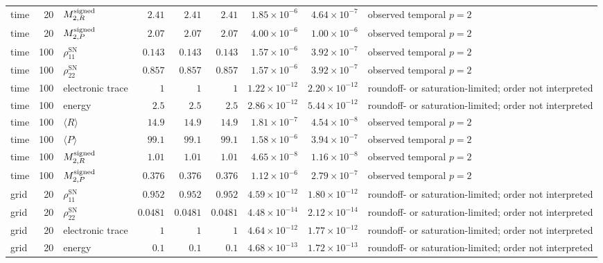 \documentclass[
  11pt,
  letterpaper,
  onehalfspacing,
  normalmargins,
  equalmargins,
  oneside
]{ut-thesis}
\begin{document}
\begin{landscape}
\begin{longtable}{l r l r r r r r L{0.18\textwidth}}
time & 20 & $M^{\rm signed}_{2,R}$ & $2.41$ & $2.41$ & $2.41$ & $1.85\times10^{-6}$ & $4.64\times10^{-7}$ & observed temporal $p=2$ \\
time & 20 & $M^{\rm signed}_{2,P}$ & $2.07$ & $2.07$ & $2.07$ & $4.00\times10^{-6}$ & $1.00\times10^{-6}$ & observed temporal $p=2$ \\
time & 100 & $\rho_{11}^{\mathrm{SN}}$ & $0.143$ & $0.143$ & $0.143$ & $1.57\times10^{-6}$ & $3.92\times10^{-7}$ & observed temporal $p=2$ \\
time & 100 & $\rho_{22}^{\mathrm{SN}}$ & $0.857$ & $0.857$ & $0.857$ & $1.57\times10^{-6}$ & $3.92\times10^{-7}$ & observed temporal $p=2$ \\
time & 100 & electronic trace & $1$ & $1$ & $1$ & $1.22\times10^{-12}$ & $2.20\times10^{-12}$ & roundoff- or saturation-limited; order not interpreted \\
time & 100 & energy & $2.5$ & $2.5$ & $2.5$ & $2.86\times10^{-12}$ & $5.44\times10^{-12}$ & roundoff- or saturation-limited; order not interpreted \\
time & 100 & $\langle R\rangle$ & $14.9$ & $14.9$ & $14.9$ & $1.81\times10^{-7}$ & $4.54\times10^{-8}$ & observed temporal $p=2$ \\
time & 100 & $\langle P\rangle$ & $99.1$ & $99.1$ & $99.1$ & $1.58\times10^{-6}$ & $3.94\times10^{-7}$ & observed temporal $p=2$ \\
time & 100 & $M^{\rm signed}_{2,R}$ & $1.01$ & $1.01$ & $1.01$ & $4.65\times10^{-8}$ & $1.16\times10^{-8}$ & observed temporal $p=2$ \\
time & 100 & $M^{\rm signed}_{2,P}$ & $0.376$ & $0.376$ & $0.376$ & $1.12\times10^{-6}$ & $2.79\times10^{-7}$ & observed temporal $p=2$ \\
grid & 20 & $\rho_{11}^{\mathrm{SN}}$ & $0.952$ & $0.952$ & $0.952$ & $4.59\times10^{-12}$ & $1.80\times10^{-12}$ & roundoff- or saturation-limited; order not interpreted \\
grid & 20 & $\rho_{22}^{\mathrm{SN}}$ & $0.0481$ & $0.0481$ & $0.0481$ & $4.48\times10^{-14}$ & $2.12\times10^{-14}$ & roundoff- or saturation-limited; order not interpreted \\
grid & 20 & electronic trace & $1$ & $1$ & $1$ & $4.64\times10^{-12}$ & $1.77\times10^{-12}$ & roundoff- or saturation-limited; order not interpreted \\
grid & 20 & energy & $0.1$ & $0.1$ & $0.1$ & $4.68\times10^{-13}$ & $1.72\times10^{-13}$ & roundoff- or saturation-limited; order not interpreted \\

\end{longtable}
\end{landscape}
\end{document}

